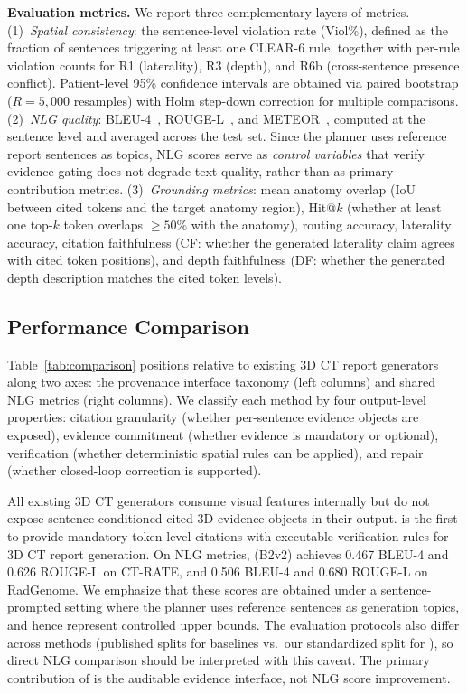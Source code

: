 \noindent\textbf{Evaluation metrics.}
We report three complementary layers of metrics.
(1)~\emph{Spatial consistency}: the sentence-level violation rate (Viol\%), defined as the fraction of sentences triggering at least one \textsc{CLEAR}-6 rule, together with per-rule violation counts for R1 (laterality), R3 (depth), and R6b (cross-sentence presence conflict).
Patient-level 95\% confidence intervals are obtained via paired bootstrap ($R{=}5{,}000$ resamples) with Holm step-down correction for multiple comparisons.
(2)~\emph{NLG quality}: BLEU-4~\cite{papineni2002bleu}, ROUGE-L~\cite{lin2004rouge}, and METEOR~\cite{banerjee2005meteor}, computed at the sentence level and averaged across the test set.
Since the planner uses reference report sentences as topics, NLG scores serve as \emph{control variables} that verify evidence gating does not degrade text quality, rather than as primary contribution metrics.
(3)~\emph{Grounding metrics}: mean anatomy overlap (IoU between cited tokens and the target anatomy region), Hit@$k$ (whether at least one top-$k$ token overlaps ${\geq}50\%$ with the anatomy), routing accuracy, laterality accuracy, citation faithfulness (CF: whether the generated laterality claim agrees with cited token positions), and depth faithfulness (DF: whether the generated depth description matches the cited token levels).


\subsection{Performance Comparison}
\label{sec:performance}

Table~\ref{tab:comparison} positions \method{} relative to existing 3D CT report generators along two axes: the provenance interface taxonomy (left columns) and shared NLG metrics (right columns).
We classify each method by four output-level properties: citation granularity (whether per-sentence evidence objects are exposed), evidence commitment (whether evidence is mandatory or optional), verification (whether deterministic spatial rules can be applied), and repair (whether closed-loop correction is supported).

All existing 3D CT generators consume visual features internally but do not expose sentence-conditioned cited 3D evidence objects in their output.
\method{} is the first to provide mandatory token-level citations with executable verification rules for 3D CT report generation.
On NLG metrics, \method{} (B2\textquotesingle v2) achieves 0.467 BLEU-4 and 0.626 ROUGE-L on CT-RATE, and 0.506 BLEU-4 and 0.680 ROUGE-L on RadGenome.
We emphasize that these scores are obtained under a sentence-prompted setting where the planner uses reference sentences as generation topics, and hence represent controlled upper bounds.
The evaluation protocols also differ across methods (published splits for baselines vs.\ our standardized split for \method{}), so direct NLG comparison should be interpreted with this caveat.
The primary contribution of \method{} is the auditable evidence interface, not NLG score improvement.

